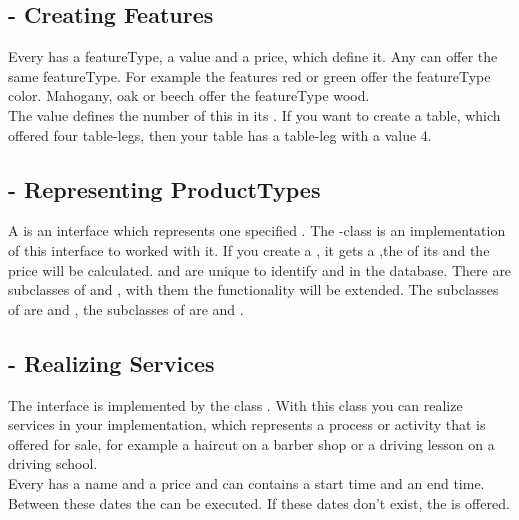 \subsection{ - Creating Features}
Every  has a featureType, a value and a price, which define it. Any {} can offer the same featureType. For example the features red or green 
offer the featureType color. Mahogany, oak or beech offer the featureType wood.\\
The value defines the number of this  in its . If you want to create a table, which offered four table-legs, then your table has a  
table-leg with a value 4.   

\subsection{ - Representing ProductTypes}
A  is an interface which represents one specified . The -class is an implementation of this interface to worked with it.
If you create a , it gets a  ,the  of its  and the price will be calculated.
 and  are unique  to identify  and  in the database. 
There are subclasses of  and , with them the functionality will be extended. The subclasses of  are  and 
, the subclasses of  are  and . 

\subsection{ - Realizing Services}
The interface  is implemented by the class . With this class you can realize services in your implementation, which represents a process 
or activity that is offered for sale, for example a haircut on a barber shop or a driving lesson on a driving school.\\
Every  has a name and a price and can contains a start time and an end time. Between these dates the  can be executed. If these dates 
don't exist, the  is offered.

